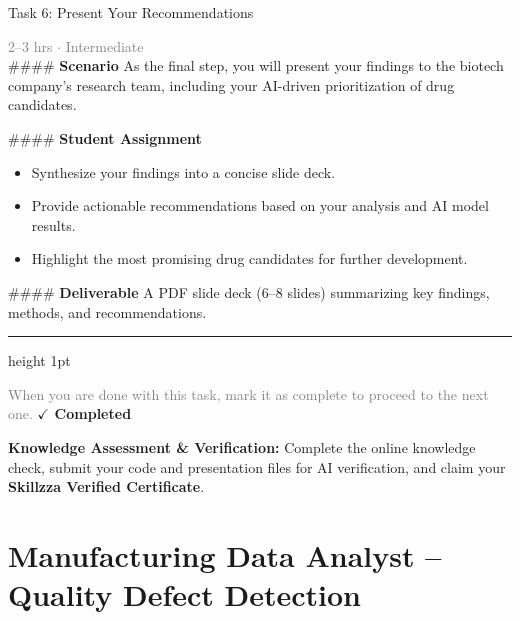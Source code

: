 \documentclass[10pt,a4paper]{article}
\begin{document}
\begin{taskbox}{Task 6: Present Your Recommendations}

    {\small \textcolor{gray}{2--3 hrs $\cdot$ Intermediate}}\\[12pt]

    \#\#\#\# \textbf{Scenario}
As the final step, you will present your findings to the biotech company’s research team, including your AI-driven prioritization of drug candidates.

\#\#\#\# \textbf{Student Assignment}
\begin{itemize}
    \item Synthesize your findings into a concise slide deck.
    \item Provide actionable recommendations based on your analysis and AI model results.
    \item Highlight the most promising drug candidates for further development.
\end{itemize}

\#\#\#\# \textbf{Deliverable}
A PDF slide deck (6–8 slides) summarizing key findings, methods, and recommendations.\par

    \vspace{16pt}

    \textcolor{cardBorder}{\hrule height 1pt}\vspace{8pt}

    \small \textcolor{gray}{When you are done with this task, mark it as complete to proceed to the next one.} \hfill \textbf{\textcolor{brandDark}{$\checkmark$ Completed}}

\end{taskbox}

\begin{completionbox}
    \textbf{Knowledge Assessment \& Verification:} Complete the online knowledge check, submit your code and presentation files for AI verification, and claim your \textbf{Skillzza Verified Certificate}.
\end{completionbox}

\newpage




\section*{Manufacturing Data Analyst – Quality Defect Detection}
\end{document}
